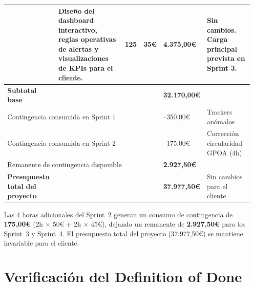 \documentclass[12pt,a4paper]{article}
\begin{document}
\begin{table}[H]
\begin{tabularx}{\textwidth}{p{3cm} X p{1.5cm} p{1.5cm} p{2cm} p{2.5cm}}
  & Diseño del dashboard interactivo, reglas operativas de alertas y visualizaciones de KPIs para el cliente.
  & 125 & 35\euro{} & 4.375,00\euro{}
  & Sin cambios. Carga principal prevista en Sprint 3. \\
\midrule
\textbf{Subtotal base} & & & & \textbf{32.170,00\euro{}} & \\
\midrule
\multicolumn{4}{l}{Contingencia consumida en Sprint 1} & --350,00\euro{} & Trackers anómalos \\
\multicolumn{4}{l}{Contingencia consumida en Sprint 2} & --175,00\euro{} & Corrección circularidad GPOA (4h) \\
\multicolumn{4}{l}{Remanente de contingencia disponible} & \textbf{2.927,50\euro{}} & \\
\midrule
\textbf{Presupuesto total del proyecto} & & & & \textbf{37.977,50\euro{}} & Sin cambios para el cliente \\
\bottomrule
\end{tabularx}
\end{table}

Las 4 horas adicionales del Sprint~2 generan un consumo de contingencia de \textbf{175,00\euro{}} (2h × 50\euro{} + 2h × 45\euro{}), dejando un remanente de \textbf{2.927,50\euro{}} para los Sprint~3 y Sprint~4. El presupuesto total del proyecto (37.977,50\euro{}) se mantiene invariable para el cliente.

\newpage
\section{Verificación del Definition of Done}
\end{document}
